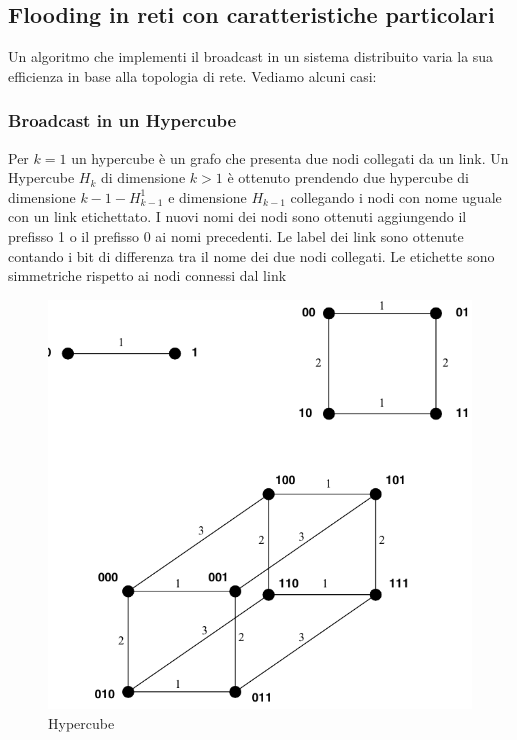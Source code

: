 \documentclass[12pt]{article}
\begin{document}
		
		
	\subsection{Flooding in reti con caratteristiche particolari}
		Un algoritmo che implementi il broadcast in un sistema distribuito varia la sua efficienza in base alla topologia di rete. Vediamo alcuni casi:
		\subsubsection{Broadcast in un Hypercube}
			Per $k=1$ un hypercube è un grafo che presenta due nodi collegati da un link.
			Un Hypercube $H_k$ di dimensione $k>1$ è ottenuto prendendo due hypercube di dimensione $k-1-H^{1}_{k-1}$ e dimensione $H_{k-1}$ collegando i nodi con nome uguale con un link etichettato. I nuovi nomi dei nodi sono ottenuti aggiungendo il prefisso 1 o il prefisso 0 ai nomi precedenti. Le label dei link sono ottenute contando i bit di differenza tra il nome dei due nodi collegati. Le etichette sono simmetriche rispetto ai nodi connessi dal link\\
			\begin{figure}[h!]
				\centering
				\includegraphics[scale=0.35]{img/hyper.png}
				\caption{Hypercube}
			\end{figure}
\end{document}
